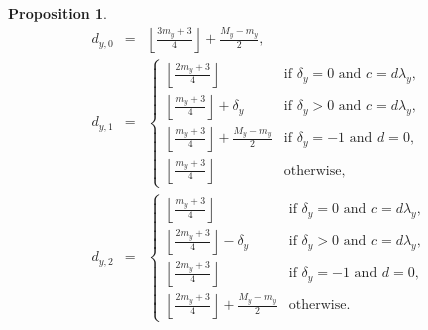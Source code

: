 \documentclass{amsart}
\numberwithin{equation}{section}
\numberwithin{table}{section}
\theoremstyle{plain}
\newtheorem{proposition}[theorem]{Proposition}
\theoremstyle{definition}
\theoremstyle{remark}
\begin{document}
\begin{proposition}
\begin{eqnarray*}
d_{y,0}&=&\left\lfloor \frac{3m_y+3}{4}\right\rfloor + \frac{M_y-m_y}{2},\\[2ex]
d_{y,1}&=&\left\{ 
\begin{array}{ll} 
\left\lfloor \frac{2m_y+3}{4}\right\rfloor &\mbox{if } \delta_y=0 \mbox{ and } c=d\lambda_y,\\
\left\lfloor \frac{m_y+3}{4}\right\rfloor + \delta_y &\mbox{if } \delta_y>0 \mbox{ and } c=d\lambda_y,\\
\left\lfloor \frac{m_y+3}{4}\right\rfloor + \frac{M_y-m_y}{2}&\mbox{if } \delta_y=-1 \mbox{ and }d=0,\\
\left\lfloor \frac{m_y+3}{4}\right\rfloor &\mbox{otherwise},
\end{array}\right.\\[2ex]
d_{y,2}&=&\left\{ 
\begin{array}{ll} 
\left\lfloor \frac{m_y+3}{4}\right\rfloor &\mbox{if } \delta_y=0 \mbox{ and } c=d\lambda_y,\\
\left\lfloor \frac{2m_y+3}{4}\right\rfloor - \delta_y &\mbox{if } \delta_y>0 \mbox{ and } c=d\lambda_y,\\
\left\lfloor \frac{2m_y+3}{4}\right\rfloor &\mbox{if } \delta_y=-1 \mbox{ and }d=0,\\
\left\lfloor \frac{2m_y+3}{4}\right\rfloor + \frac{M_y-m_y}{2} & \mbox{otherwise}.
\end{array}\right.
\end{eqnarray*}
\end{proposition}
\end{document}
